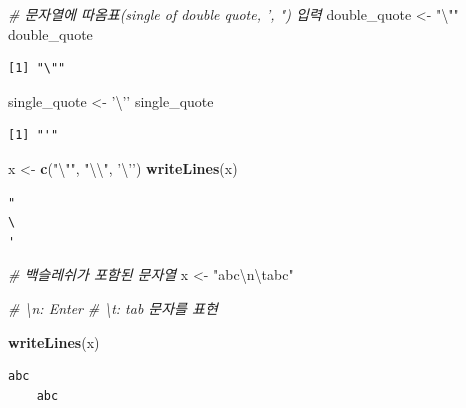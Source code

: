 \documentclass[
  11pt,
]{krantz}
\newenvironment{Shaded}{\begin{snugshade}}{\end{snugshade}}
\newcommand{\CharTok}[1]{\textcolor[rgb]{0.5,0.5,0.5}{#1}}
\newcommand{\CommentTok}[1]{\textcolor[rgb]{0.37,0.37,0.37}{\textit{#1}}}
\newcommand{\KeywordTok}[1]{\textcolor[rgb]{0.27,0.27,0.27}{\textbf{#1}}}
\newcommand{\NormalTok}[1]{#1}
\newcommand{\StringTok}[1]{\textcolor[rgb]{0.5,0.5,0.5}{#1}}
\begin{document}
\begin{Shaded}
\begin{Highlighting}[]
\CommentTok{# 문자열에 따옴표(single of double quote, ', ") 입력}
\NormalTok{double_quote <-}\StringTok{ "}\CharTok{\textbackslash{}"}\StringTok{"} 
\NormalTok{double_quote}
\end{Highlighting}
\end{Shaded}

\begin{verbatim}
[1] "\""
\end{verbatim}

\begin{Shaded}
\begin{Highlighting}[]
\NormalTok{single_quote <-}\StringTok{ '}\CharTok{\textbackslash{}'}\StringTok{'} 
\NormalTok{single_quote}
\end{Highlighting}
\end{Shaded}

\begin{verbatim}
[1] "'"
\end{verbatim}

\begin{Shaded}
\begin{Highlighting}[]
\NormalTok{x <-}\StringTok{ }\KeywordTok{c}\NormalTok{(}\StringTok{"}\CharTok{\textbackslash{}"}\StringTok{"}\NormalTok{, }\StringTok{"}\CharTok{\textbackslash{}\textbackslash{}}\StringTok{"}\NormalTok{, }\StringTok{'}\CharTok{\textbackslash{}'}\StringTok{'}\NormalTok{)}
\KeywordTok{writeLines}\NormalTok{(x)}
\end{Highlighting}
\end{Shaded}

\begin{verbatim}
"
\
'
\end{verbatim}

\begin{Shaded}
\begin{Highlighting}[]
\CommentTok{# 백슬레쉬가 포함된 문자열}
\NormalTok{x <-}\StringTok{ "abc}\CharTok{\textbackslash{}n\textbackslash{}t}\StringTok{abc"}

\CommentTok{# \textbackslash{}n: Enter}
\CommentTok{# \textbackslash{}t: tab 문자를 표현}

\KeywordTok{writeLines}\NormalTok{(x)}
\end{Highlighting}
\end{Shaded}

\begin{verbatim}
abc
    abc
\end{verbatim}
\end{document}
